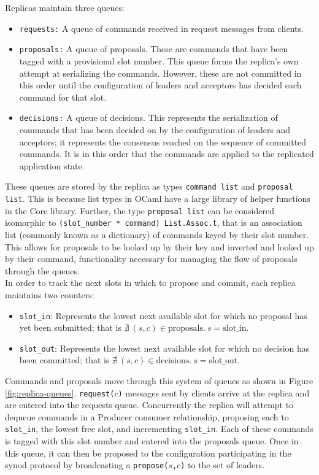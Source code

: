 Replicas maintain three queues: 
\begin{itemize}
  \item \texttt{requests:} A queue of commands received in request messages from clients.
  \item \texttt{proposals:} A queue of proposals. These are commands that have been tagged with a provisional slot number. This queue forms the replica's own attempt at serializing the commands. However, these are not committed in this order until the configuration of leaders and acceptors has decided each command for that slot.
  \item \texttt{decisions:} A queue of decisions. This represents the serialization of commands that has been decided on by the configuration of leaders and acceptors; it represents the consensus reached on the sequence of committed commands. It is in this order that the commands are applied to the replicated application state.
\end{itemize}

These queues are stored by the replica as types \texttt{command list} and \texttt{proposal list}. This is because list types in OCaml have a large library of helper functions in the Core library. Further, the type \texttt{proposal list} can be considered isomorphic to \texttt{(slot\_number * command) List.Assoc.t}, that is an association list (commonly known as a dictionary) of commands keyed by their slot number. This allows for proposals to be looked up by their key and inverted and looked up by their command, functionality necessary for managing the flow of proposals through the queues. \\

In order to track the next slots in which to propose and commit, each replica maintains two counters:
\begin{itemize}
  \item \texttt{slot\_in}: Represents the lowest next available slot for which no proposal has yet been submitted; that is $\nexists  \ \left( s, c \right) \in \textrm{proposals}. \ s = \textrm{slot\_in}$.
  \item \texttt{slot\_out}: Represents the lowest next available slot for which no decision has been committed; that is $\nexists \ \left( s, c \right) \in \textrm{decisions}. \ s = \textrm{slot\_out}$.
\end{itemize}

Commands and proposals move through this system of queues as shown in Figure \ref{fig:replica-queues}. \texttt{request($c$)} messages sent by clients arrive at the replica and are entered into the requests queue. Concurrently the replica will attempt to dequeue commands {\color{red} in a Producer consumer relationship}, proposing each to \texttt{slot\_in}, the lowest free slot, and incrementing \texttt{slot\_in}. Each of these commands is tagged with this slot number and entered into the proposals queue. Once in this queue, it can then be proposed to the configuration participating in the synod protocol by broadcasting a \texttt{propose($s$,$c$)} to the set of leaders. \\

